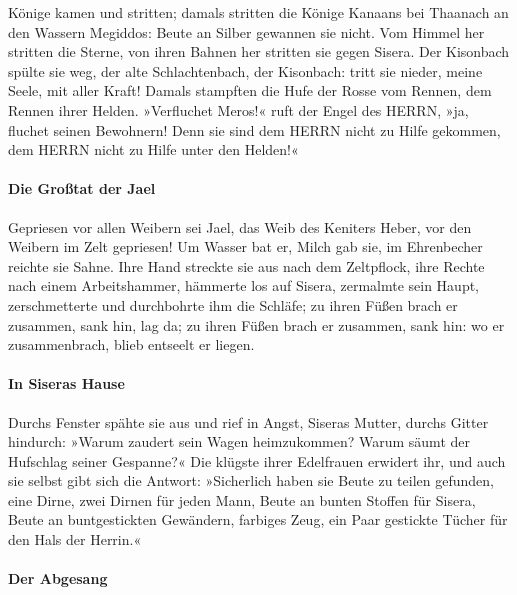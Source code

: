 Könige kamen und stritten; damals stritten die Könige
Kanaans bei Thaanach an den Wassern Megiddos: Beute an Silber gewannen
sie nicht. Vom Himmel her stritten die Sterne, von ihren
Bahnen her stritten sie gegen Sisera. Der Kisonbach
spülte sie weg, der alte Schlachtenbach, der Kisonbach: tritt sie
nieder, meine Seele, mit aller Kraft! Damals stampften
die Hufe der Rosse vom Rennen, dem Rennen ihrer Helden.
»Verfluchet Meros!« ruft der Engel des HERRN, »ja,
fluchet seinen Bewohnern! Denn sie sind dem HERRN nicht zu Hilfe
gekommen, dem HERRN nicht zu Hilfe unter den Helden!«

\hypertarget{die-grouxdftat-der-jael}{%
\paragraph{Die Großtat der Jael}\label{die-grouxdftat-der-jael}}

Gepriesen vor allen Weibern sei Jael, das Weib des
Keniters Heber, vor den Weibern im Zelt gepriesen! Um
Wasser bat er, Milch gab sie, im Ehrenbecher reichte sie Sahne.
Ihre Hand streckte sie aus nach dem Zeltpflock, ihre
Rechte nach einem Arbeitshammer, hämmerte los auf Sisera, zermalmte sein
Haupt, zerschmetterte und durchbohrte ihm die Schläfe; zu
ihren Füßen brach er zusammen, sank hin, lag da; zu ihren Füßen brach er
zusammen, sank hin: wo er zusammenbrach, blieb entseelt er liegen.

\hypertarget{in-siseras-hause}{%
\paragraph{In Siseras Hause}\label{in-siseras-hause}}

Durchs Fenster spähte sie aus und rief in Angst, Siseras
Mutter, durchs Gitter hindurch: »Warum zaudert sein Wagen heimzukommen?
Warum säumt der Hufschlag seiner Gespanne?« Die klügste
ihrer Edelfrauen erwidert ihr, und auch sie selbst gibt sich die
Antwort: »Sicherlich haben sie Beute zu teilen gefunden,
eine Dirne, zwei Dirnen für jeden Mann, Beute an bunten Stoffen für
Sisera, Beute an buntgestickten Gewändern, farbiges Zeug, ein Paar
gestickte Tücher für den Hals der Herrin.«

\hypertarget{der-abgesang}{%
\paragraph{Der Abgesang}\label{der-abgesang}}


